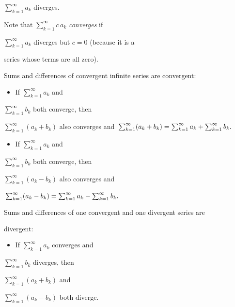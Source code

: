     $\textstyle \sum _{k=1}^{\infty} a _k$ diverges.



Note that $\textstyle \sum _{k=1}^{\infty} c\,a _k$ \textit{converges} if

$\textstyle \sum _{k=1}^{\infty} a _k$ diverges but $c=0$ (because it is a

series whose terms are all zero).



Sums and differences of convergent infinite series are convergent:



\begin{itemize}
    \item If $\textstyle \sum _{k=1}^{\infty} a _k$ and
\end{itemize}
    $\textstyle \sum _{k=1}^{\infty} b _k$ both converge, then

    $\textstyle \sum _{k=1}^{\infty} (a _k+b _k)$ also converges and $\newline \textstyle \sum _{k=1}^{\infty} (a _k+b _k) = \sum _{k=1}^{\infty} a _k + \sum _{k=1}^{\infty} b _k.\newline$

\begin{itemize}
    \item If $\textstyle \sum _{k=1}^{\infty} a _k$ and
\end{itemize}
    $\textstyle \sum _{k=1}^{\infty} b _k$ both converge, then

    $\textstyle \sum _{k=1}^{\infty} (a _k-b _k)$ also converges and

    $\newline \textstyle \sum _{k=1}^{\infty} (a _k-b _k) = \sum _{k=1}^{\infty} a _k - \sum _{k=1}^{\infty} b _k. \newline$



Sums and differences of one convergent and one divergent series are

divergent:



\begin{itemize}
    \item If $\textstyle \sum _{k=1}^{\infty} a _k$ converges and
\end{itemize}
    $\textstyle \sum _{k=1}^{\infty} b _k$ diverges, then

    $\textstyle \sum _{k=1}^{\infty} (a _k+b _k)$ and

    $\textstyle \sum _{k=1}^{\infty} (a _k-b _k)$ both diverge.

